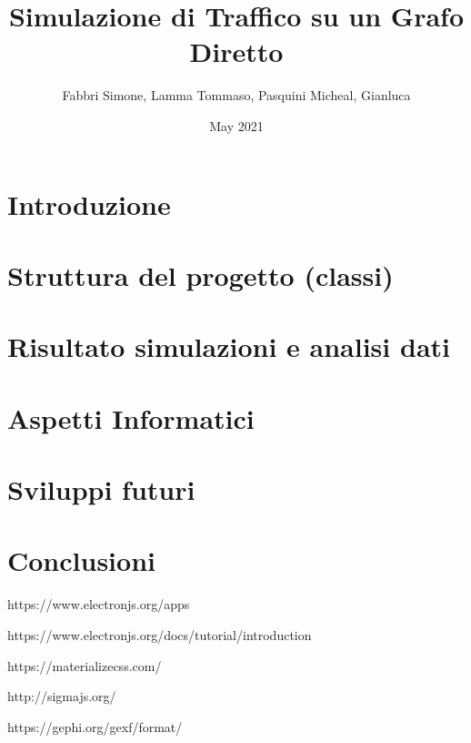 \documentclass{article}
\title{Simulazione di Traffico su un Grafo Diretto}
\author{ Fabbri Simone, Lamma Tommaso, Pasquini Micheal, Gianluca }
\date{May 2021}
\begin{document}
\maketitle

\tableofcontents

\newpage

\section{Introduzione}

    

\section{Struttura del progetto (classi)}

    

    \newpage

\section{Risultato simulazioni e analisi dati}

    

\section{Aspetti Informatici}

    

\section{Sviluppi futuri}
\label{section:sviluppi}

    

\section{Conclusioni}

    


\begin{thebibliography}{9}
https://www.electronjs.org/apps

https://www.electronjs.org/docs/tutorial/introduction

https://materializecss.com/

http://sigmajs.org/

https://gephi.org/gexf/format/

\end{thebibliography}
\end{document}
